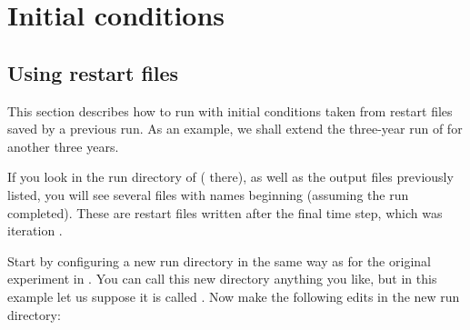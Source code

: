 \clearpage
\section{Initial conditions}
\label{sec:inits}

\subsection{Using restart files}
\label{sec:inits-restarts}

This section describes how to run \NEMOSIcu{} with initial conditions taken from restart files saved by a previous run.
As an example, we shall extend the three-year run of  for another three years.

If you look in the run directory of  ( there), as well as the output files previously listed, you will see several files with names beginning \linebreak{} (assuming the run completed).
These are restart files written after the final time step, which was iteration .

Start by configuring a new run directory in the same way as for the original experiment in .
You can call this new directory anything you like, but in this example let us suppose it is called .
Now make the following edits in the new run directory:

